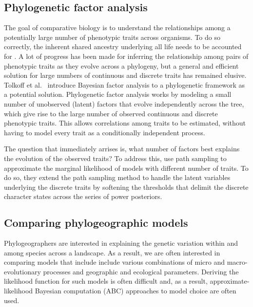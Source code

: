 
\subsection{Phylogenetic factor analysis}

The goal of comparative biology is to understand the relationships among a
potentially large number of phenotypic traits across organisms. 
To do so correctly, the inherent shared ancestry underlying all life needs to
be accounted for \citep{Felsenstein1985PIC}.
A lot of progress has been made for inferring the relationship among pairs
of phenotypic traits as they evolve across a phylogeny,
but a general and efficient solution for large numbers of continuous
and discrete traits has remained elusive.
Tolkoff et al.\ \citeyear{Tolkoff2017} introduce Bayesian factor analysis to a
phylogenetic framework as a potential solution.
Phylogenetic factor analysis works by modeling a small number of unobserved
(latent) factors that evolve independently across the tree, which give rise to
the large number of observed continuous and discrete phenotypic traits.
This allows correlations among traits to be estimated, without having to model
every trait as a conditionally independent process.

The question that immediately arrises is, what number of factors best explains
the evolution of the observed traits?
To address this, \citep{Tolkoff2017} use path sampling to approximate the
marginal likelihood of models with different number of traits.
To do so, they extend the path sampling method to handle the latent variables
underlying the discrete traits by softening the thresholds that delimit the
discrete character states across the series of power posteriors.


\subsection{Comparing phylogeographic models}

Phylogeographers are interested in explaining the genetic variation within and
among species across a landscape.
As a result, we are often interested in comparing models that include include
various combinations of micro and macro-evolutionary processes and geographic
and ecological parameters.
Deriving the likelihood function for such models is often difficult and, as a
result, approximate-likelihood Bayesian computation (ABC) approaches to model
choice are often used.

